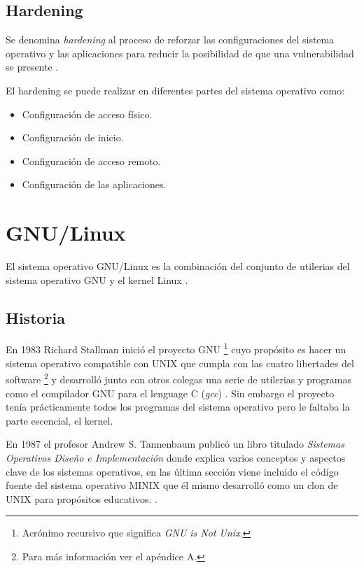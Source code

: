   \subsection {Hardening}

Se denomina \textit{hardening} al proceso de reforzar las configuraciones del sistema operativo y las aplicaciones para reducir la posibilidad de que una vulnerabilidad se presente \cite{padilla_buenas_2009}.

El hardening se puede realizar en diferentes partes del sistema operativo como:

\begin{itemize}
  \item Configuraci\'{o}n de acceso f\'{i}sico.
  \item Configuraci\'{o}n de inicio.
  \item Configuraci\'{o}n de acceso remoto.
  \item Configuraci\'{o}n de las aplicaciones.
\end{itemize}

\section {GNU/Linux}

El sistema operativo GNU/Linux es la combinaci\'{o}n del conjunto de utilerias del sistema operativo GNU y el kernel Linux \cite{_linux_????}.

  \subsection {Historia}

En 1983 Richard Stallman inici\'{o} el proyecto \textsc{GNU} \footnote{Acr\'{o}nimo recursivo que significa \textit{GNU is Not Unix}.} cuyo prop\'{o}sito es hacer un sistema operativo compatible con \textsc{UNIX} que cumpla con las cuatro libertades del software \footnote{Para m\'{a}s informaci\'{o}n ver el ap\'{e}ndice A.} y desarroll\'{o} junto con otros colegas una serie de utilerias y programas como el compilador \textsc{GNU} para el lenguage \textsc{C} (\textit{gcc}) \cite{_about_????}. Sin embargo el proyecto ten\'{i}a pr\'{a}cticamente todos los programas del sistema operativo pero le faltaba la parte escencial, el kernel.

En 1987 el profesor Andrew S. Tannenbaum public\'{o} un libro titulado \textit{Sistemas Operativos Dise\~{n}o e Implementaci\'{o}n} \cite{tanenbaum_operating_2006} donde explica varios conceptos y aspectos clave de los sistemas operativos, en las \'{u}ltima secci\'{o}n viene incluido el c\'{o}digo fuente del sistema operativo \textsc{MINIX} que \'{e}l mismo desarroll\'{o} como un clon de \textsc{UNIX} para prop\'{o}sitos educativos. \cite{_complete_????}.

